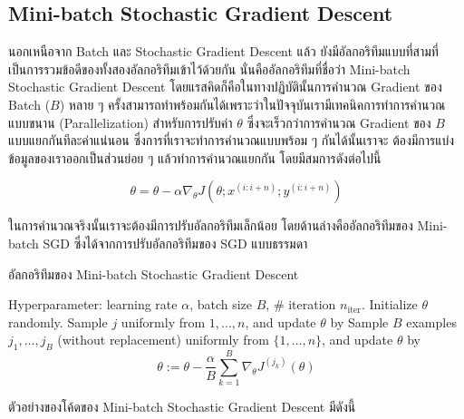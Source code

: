 \subsection{Mini-batch Stochastic Gradient Descent}
\label{ssec:minibatch_grad}

นอกเหนือจาก Batch และ Stochastic Gradient Descent แล้ว ยังมีอัลกอริทึมแบบที่สามที่เป็นการรวมข้อดีของทั้งสองอัลกอริทึมเข้าไว้ด้วยกัน
นั่นคืออัลกอริทึมที่ชื่อว่า Mini-batch Stochastic Gradient Descent โดยแรสคิดก็คือในทางปฏิบัตินั้นการคำนวณ Gradient ของ Batch 
($B$) หลาย ๆ ครั้งสามารถทำพร้อมกันได้เพราะว่าในปัจจุบันเรามีเทคนิคการทำการคำนวณแบบขนาน (Parallelization) สำหรับการปรับค่า 
$\theta$ ซึ่งจะเร็วกว่าการคำนวณ Gradient ของ $B$ แบบแยกกันทีละค่าแน่นอน ซึ่งการที่เราจะทำการคำนวณแบบพร้อม ๆ กันได้นั้นเราจะ%
ต้องมีการแบ่งข้อมูลของเราออกเป็นส่วนย่อย ๆ แล้วทำการคำนวณแยกกัน โดยมีสมการดังต่อไปนี้ 

\begin{equation}\label{eq:minibatch}
    \theta = \theta - \alpha\nabla_\theta J( \theta; x^{(i:i+n)}; y^{(i:i+n)})
\end{equation}

ในการคำนวณจริงนั้นเราจะต้องมีการปรับอัลกอริทึมเล็กน้อย โดยด้านล่างคืออัลกอริทึมของ Mini-batch SGD ซึ่งได้จากการปรับอัลกอริทึมของ SGD 
แบบธรรมดา

\begin{algorithm}[H]
    \caption{อัลกอริทึมของ Mini-batch Stochastic Gradient Descent}
    \label{alg:minibatch}
    \begin{algorithmic}
    \State Hyperparameter: learning rate $\alpha$, batch size $B$, \# iteration $n_\text{iter}$.
    \State Initialize $\theta$ randomly.
        \State Sample $j$ uniformly from ${1,\ldots,n}$, and update $\theta$ by
        \State Sample $B$ examples $j_1,\ldots,j_B$ (without replacement) uniformly from $\{1,\ldots,n\}$, 
        and update $\theta$ by
        \begin{equation*}
            \theta := \theta - \frac{\alpha}{B}\sum_{k=1}^B\nabla_\theta J^{(j_k)}(\theta)
        \end{equation*}
    \EndFor
    \end{algorithmic}
\end{algorithm}

\noindent ตัวอย่างของโค้ดของ Mini-batch Stochastic Gradient Descent มีดังนี้

